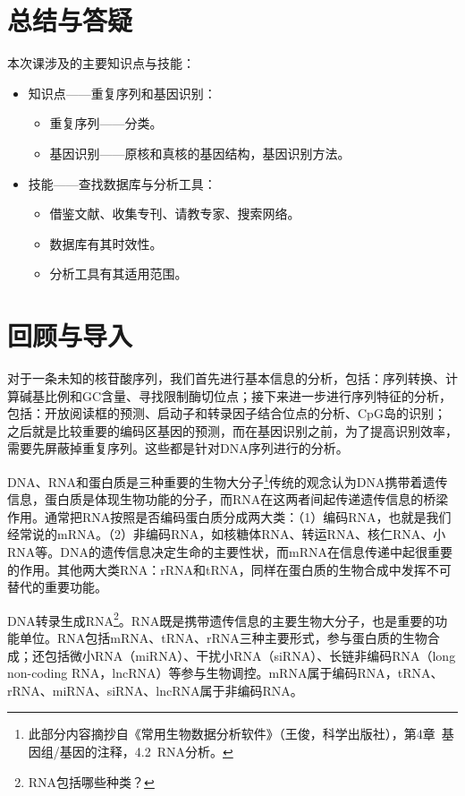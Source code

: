 \documentclass[11pt,a4paper,twoside]{book}
\begin{document}
\section{总结与答疑}
本次课涉及的主要知识点与技能：
\begin{itemize}
  \item 知识点——重复序列和基因识别：
    \begin{itemize}
      \item 重复序列——分类。
      \item 基因识别——原核和真核的基因结构，基因识别方法。
    \end{itemize}
  \item 技能——查找数据库与分析工具：
    \begin{itemize}
      \item 借鉴文献、收集专刊、请教专家、搜索网络。
      \item 数据库有其时效性。
      \item 分析工具有其适用范围。
    \end{itemize}
\end{itemize}

\section{回顾与导入}
对于一条未知的核苷酸序列，我们首先进行基本信息的分析，包括：序列转换、计算碱基比例和GC含量、寻找限制酶切位点；接下来进一步进行序列特征的分析，包括：开放阅读框的预测、启动子和转录因子结合位点的分析、CpG岛的识别；之后就是比较重要的编码区基因的预测，而在基因识别之前，为了提高识别效率，需要先屏蔽掉重复序列。这些都是针对DNA序列进行的分析。

DNA、RNA和蛋白质是三种重要的生物大分子\footnote{此部分内容摘抄自《常用生物数据分析软件》（王俊，科学出版社），第4章\ 基因组/基因的注释，4.2\ RNA分析。}传统的观念认为DNA携带着遗传信息，蛋白质是体现生物功能的分子，而RNA在这两者间起传递遗传信息的桥梁作用。通常把RNA按照是否编码蛋白质分成两大类：（1）编码RNA，也就是我们经常说的mRNA。（2）非编码RNA，如核糖体RNA、转运RNA、核仁RNA、小RNA等。DNA的遗传信息决定生命的主要性状，而mRNA在信息传递中起很重要的作用。其他两大类RNA：rRNA和tRNA，同样在蛋白质的生物合成中发挥不可替代的重要功能。

DNA转录生成RNA\footnote{RNA包括哪些种类？}。RNA既是携带遗传信息的主要生物大分子，也是重要的功能单位。RNA包括mRNA、tRNA、rRNA三种主要形式，参与蛋白质的生物合成；还包括微小RNA（miRNA）、干扰小RNA（siRNA）、长链非编码RNA（long non-coding RNA，lncRNA）等参与生物调控。mRNA属于编码RNA，tRNA、rRNA、miRNA、siRNA、lncRNA属于非编码RNA。
\end{document}
